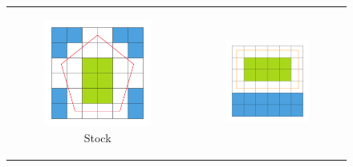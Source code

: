 \begin{figure}[!h]
	\centering
	\begin{tabular}{cc}
		\begin{subfigure}[t]{0.3\textwidth}
			\centering
			\includegraphics[width=\textwidth]{images/classification_before}
			\caption{Stock}
			\label{fig:classification_before}
		\end{subfigure}&
		\begin{subfigure}[t]{0.3\textwidth}
			\centering
			\includegraphics[width=\textwidth]{images/classification_sv}

\end{subfigure}
\end{tabular}
\end{figure}
